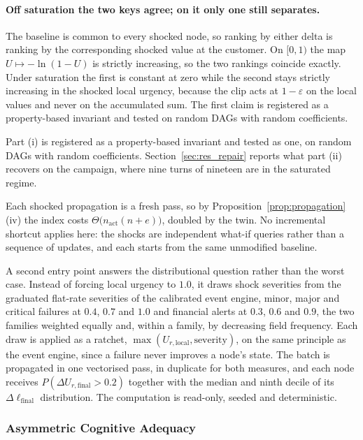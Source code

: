 \paragraph{Off saturation the two keys agree; on it only one still separates.}
\label{prop:order}
The baseline is common to every shocked node, so ranking by either delta is ranking by the
corresponding shocked value at the customer. On $[0,1)$ the map $U \mapsto -\ln(1-U)$ is
strictly increasing, so the two rankings coincide exactly. Under saturation the first is
constant at zero while the second stays strictly increasing in the shocked local urgency,
because the clip acts at $1-\varepsilon$ on the local values and never on the accumulated
sum. The first claim is registered as a property-based invariant and tested on random DAGs
with random coefficients.

Part (i) is registered as a property-based invariant and tested as one, on random DAGs with
random coefficients. Section~\ref{sec:res_repair} reports what part (ii) recovers on the
campaign, where nine turns of nineteen are in the saturated regime.

Each shocked propagation is a fresh pass, so by Proposition~\ref{prop:propagation}(iv) the
index costs $\Theta\bigl(n_{\text{act}}(n+e)\bigr)$, doubled by the twin. No incremental
shortcut applies here: the shocks are independent what-if queries rather than a sequence of
updates, and each starts from the same unmodified baseline.

A second entry point answers the distributional question rather than the worst case. Instead
of forcing local urgency to $1.0$, it draws shock severities from the graduated flat-rate
severities of the calibrated event engine, minor, major and critical failures at $0.4$, $0.7$
and $1.0$ and financial alerts at $0.3$, $0.6$ and $0.9$, the two families weighted equally
and, within a family, by decreasing field frequency. Each draw is applied as a ratchet,
$\max(U_{r,\text{local}}, \text{severity})$, on the same principle as the event engine,
since a failure never improves a node's state. The batch is propagated in one vectorised
pass, in duplicate for both measures, and each node receives
$P(\Delta U_{r,\text{final}} > 0.2)$ together with the median and ninth decile of its
$\Delta \ell_{\text{final}}$ distribution. The computation is read-only, seeded and
deterministic.

\subsubsection{Asymmetric Cognitive Adequacy}
\label{sec:model_adequacy}

